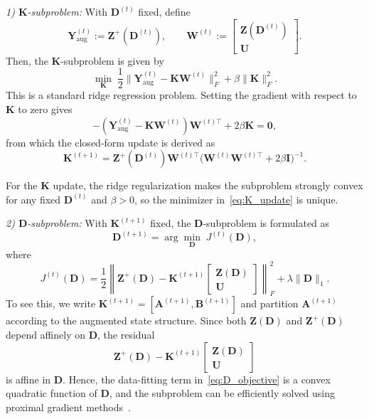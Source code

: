 \documentclass[letterpaper,10pt,conference]{ieeeconf}
\newcommand{\Kmat}{\mathbf{K}}
\newcommand{\Dmat}{\mathbf{D}}
\newcommand{\A}{\mathbf{A}}
\newcommand{\B}{\mathbf{B}}
\newcommand{\I}{\mathbf{I}}
\newcommand{\Zmat}{\mathbf{Z}}
\newcommand{\Umat}{\mathbf{U}}
\newcommand{\W}{\mathbf{W}}
\begin{document}
\textit{1) $\Kmat$-subproblem:}
With $\Dmat^{(t)}$ fixed, define
\[
\mathbf{Y}_{\mathrm{aug}}^{(t)} := \Zmat^+(\Dmat^{(t)}), \qquad
\W^{(t)} :=
\begin{bmatrix}
\Zmat(\Dmat^{(t)}) \\ \Umat
\end{bmatrix}.
\]
Then, the $\Kmat$-subproblem is given by
\[
\min_{\Kmat} \; 
\frac{1}{2}\|\mathbf{Y}_{\mathrm{aug}}^{(t)}
- \Kmat \W^{(t)}\|_F^2
+ \beta\|\Kmat\|_F^2 .
\]
This is a standard ridge regression problem. Setting the gradient with respect to $\Kmat$ to zero gives
\[
-(\mathbf{Y}_{\mathrm{aug}}^{(t)} - \Kmat \W^{(t)})
\W^{(t)\top} + 2\beta\Kmat = \mathbf{0},
\]
from which the closed-form update is derived as
\begin{equation}
\label{eq:K_update}
\Kmat^{(t+1)}
= \Zmat^+(\Dmat^{(t)}) \W^{(t)\top}
\bigl( \W^{(t)} \W^{(t)\top} + 2\beta \I \bigr)^{-1}.
\end{equation}

For the $\Kmat$ update, the ridge regularization makes the subproblem strongly convex for any fixed $\Dmat^{(t)}$ and $\beta>0$, so the minimizer in~\eqref{eq:K_update} is unique.

\textit{2) $\Dmat$-subproblem:} With $\Kmat^{(t+1)}$ fixed, the $\Dmat$-subproblem is formulated as
\begin{equation}
\label{eq:D_subproblem}
\Dmat^{(t+1)} = \arg\min_{\Dmat} \; J^{(t)}(\Dmat),
\end{equation}
where
\begin{equation}
\label{eq:D_objective}
J^{(t)}(\Dmat) = \frac{1}{2}\left\| \Zmat^+(\Dmat) - \Kmat^{(t+1)}
\begin{bmatrix}
\Zmat(\Dmat) \\ \Umat
\end{bmatrix} \right\|_F^2
+ \lambda\|\Dmat\|_1.
\end{equation}
To see this, we write $\Kmat^{(t+1)} = [\A^{(t+1)},\B^{(t+1)}]$ and partition $\A^{(t+1)}$ according to the augmented state structure. Since both $\Zmat(\Dmat)$ and $\Zmat^+(\Dmat)$ depend affinely on $\Dmat$, the residual
\[
\Zmat^+(\Dmat) - \Kmat^{(t+1)}
\begin{bmatrix}
\Zmat(\Dmat) \\ \Umat
\end{bmatrix}
\]
is affine in $\Dmat$. Hence, the data-fitting term in~\eqref{eq:D_objective} is a convex quadratic function of $\Dmat$, and the subproblem can be efficiently solved using proximal gradient methods~\cite{Beck2009ISTA}.
\end{document}
